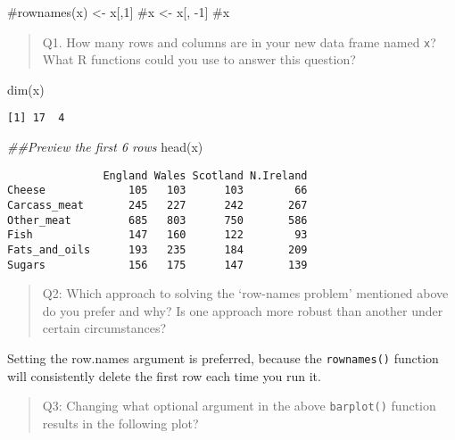\documentclass[
  letterpaper,
  DIV=11,
  numbers=noendperiod]{scrartcl}
\newenvironment{Shaded}{\begin{snugshade}}{\end{snugshade}}
\newcommand{\CommentTok}[1]{\textcolor[rgb]{0.37,0.37,0.37}{#1}}
\newcommand{\DocumentationTok}[1]{\textcolor[rgb]{0.37,0.37,0.37}{\textit{#1}}}
\newcommand{\FunctionTok}[1]{\textcolor[rgb]{0.28,0.35,0.67}{#1}}
\newcommand{\NormalTok}[1]{\textcolor[rgb]{0.00,0.23,0.31}{#1}}
\begin{document}
\begin{Shaded}
\begin{Highlighting}[]
\CommentTok{\#rownames(x) \textless{}{-}  x[,1]}
\CommentTok{\#x \textless{}{-} x[, {-}1]}
\CommentTok{\#x}
\end{Highlighting}
\end{Shaded}

\begin{quote}
Q1. How many rows and columns are in your new data frame named
\texttt{x}? What R functions could you use to answer this question?
\end{quote}

\begin{Shaded}
\begin{Highlighting}[]
\FunctionTok{dim}\NormalTok{(x)}
\end{Highlighting}
\end{Shaded}

\begin{verbatim}
[1] 17  4
\end{verbatim}

\begin{Shaded}
\begin{Highlighting}[]
\DocumentationTok{\#\#Preview the first 6 rows}
\FunctionTok{head}\NormalTok{(x)}
\end{Highlighting}
\end{Shaded}

\begin{verbatim}
               England Wales Scotland N.Ireland
Cheese             105   103      103        66
Carcass_meat       245   227      242       267
Other_meat         685   803      750       586
Fish               147   160      122        93
Fats_and_oils      193   235      184       209
Sugars             156   175      147       139
\end{verbatim}

\begin{quote}
Q2: Which approach to solving the `row-names problem' mentioned above do
you prefer and why? Is one approach more robust than another under
certain circumstances?
\end{quote}

Setting the row.names argument is preferred, because the
\texttt{rownames()} function will consistently delete the first row each
time you run it.

\begin{quote}
Q3: Changing what optional argument in the above \texttt{barplot()}
function results in the following plot?
\end{quote}
\end{document}
